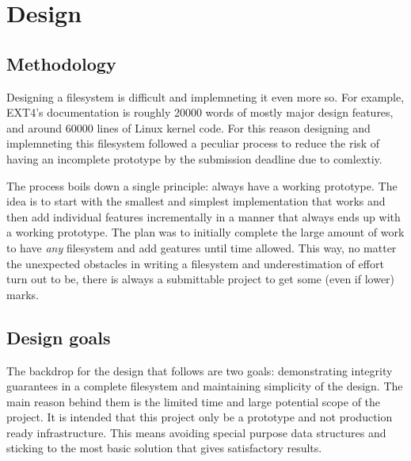 \chapter{Design}

    \section{Methodology}
        \label{sec_methodology}

        Designing a filesystem is difficult and implemneting it even more so.
        For example, EXT4's documentation \cite{ext4_docs} is roughly 20000
        words of mostly major design features, and around 60000 lines of Linux
        kernel code. For this reason designing and implemneting this filesystem
        followed a peculiar process to reduce the risk of having an incomplete
        prototype by the submission deadline due to comlextiy.

        The process boils down a single principle: always have a working
        prototype. The idea is to start with the smallest and simplest
        implementation that works and then add individual features
        incrementally in a manner that always ends up with a working prototype.
        The plan was to initially complete the large amount of work to have
        \textit{any} filesystem and add geatures until time allowed. This way,
        no matter the unexpected obstacles in writing a filesystem and
        underestimation of effort turn out to be, there is always a submittable
        project to get some (even if lower) marks.


    \section{Design goals}

        The backdrop for the design that follows are two goals: demonstrating
        integrity guarantees in a complete filesystem and maintaining
        simplicity of the design. The main reason behind them is the limited
        time and large potential scope of the project. It is intended that this
        project only be a prototype and not production ready infrastructure.
        This means avoiding special purpose data structures and sticking to the
        most basic solution that gives satisfactory results.

